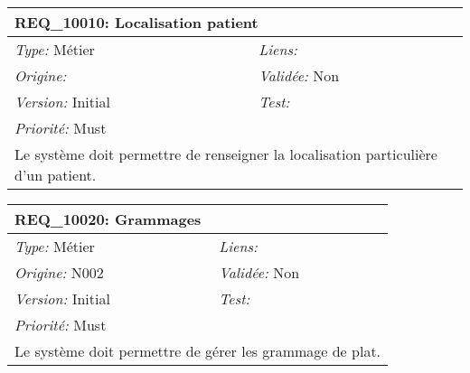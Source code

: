 \begin{table}[!h]

\begin{tabular}{|p{60mm}p{100mm}|}

\hline

\multicolumn{2}{|l|}{\textbf{REQ\_10010:} Localisation patient} \\ \hline

\emph{Type:} Métier & \emph{Liens:}  \\

\emph{Origine:}  & \emph{Validée:} Non \\

\emph{Version:} Initial & \emph{Test:}  \\

\emph{Priorité:} Must & \\ \hline

\multicolumn{2}{|p{16cm}|}{Le système doit permettre de renseigner la localisation particulière d'un patient.} \\ \hline

\end{tabular}

\end{table}



\begin{table}[!h]

\begin{tabular}{|p{60mm}p{100mm}|}

\hline

\multicolumn{2}{|l|}{\textbf{REQ\_10020:} Grammages} \\ \hline

\emph{Type:} Métier & \emph{Liens:}  \\

\emph{Origine:} N002 & \emph{Validée:} Non \\

\emph{Version:} Initial & \emph{Test:}  \\

\emph{Priorité:} Must & \\ \hline

\multicolumn{2}{|p{16cm}|}{Le système doit permettre de gérer les grammage de plat.} \\ \hline

\end{tabular}

\end{table}



